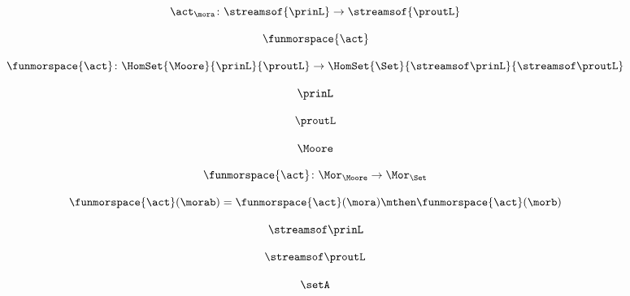 \begin{forslides}
    \begin{equation}
        \label{eq:slides-processes-25}
        \act_{\mora} \colon \streamsof{\prinL} \to \streamsof {\proutL}
    \end{equation}

    \begin{equation}
        \label{eq:slides-processes-26}
        \funmorspace{\act}
    \end{equation}

    \begin{equation}
        \label{eq:slides-processes-27}
        \funmorspace{\act} \colon  \HomSet{\Moore}{\prinL}{\proutL} \to \HomSet{\Set}{\streamsof\prinL}{\streamsof\proutL}
    \end{equation}

    \begin{equation}
        \label{eq:slides-processes-28}
        \prinL
    \end{equation}

    \begin{equation}
        \label{eq:slides-processes-29}
        \proutL
    \end{equation}

    \begin{equation}
        \label{eq:slides-processes-30}
        \Moore
    \end{equation}

    \begin{equation}
        \label{eq:slides-processes-31}
        \funmorspace{\act} \colon \Mor_\Moore \to \Mor_\Set
    \end{equation}

    \begin{equation}
        \label{eq:slides-processes-32}
        \funmorspace{\act}(\morab) = \funmorspace{\act}(\mora) \mthen \funmorspace{\act}(\morb)
    \end{equation}

    \begin{equation}
        \label{eq:slides-processes-33}
        \streamsof\prinL
    \end{equation}

    \begin{equation}
        \label{eq:slides-processes-34}
        \streamsof\proutL
    \end{equation}

    \begin{equation}
        \label{eq:slides-processes-35}
        \setA
    \end{equation}


\end{forslides}
